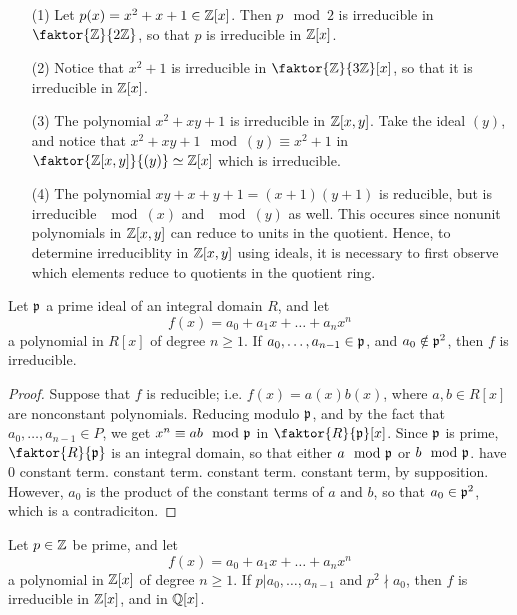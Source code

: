 \begin{example}\label{example_7.5}
    \begin{enumerate}
        \item[(1)] Let $p(x)=x^2+x+1 \in \mathbb{Z}[x]$. Then $p \mod{2}$ is irreducible
            in $\faktor{\Z}{2\Z}$, so that $p$ is irreducible in  $\mathbb{Z}[x]$.

        \item[(2)] Notice that $x^2+1$ is irreducible in  $\faktor{\Z}{3\Z}[x]$,
            so that it is irreducible in $\mathbb{Z}[x]$.

        \item[(3)] The polynomial $x^2+xy+1$ is irreducible in  $\mathbb{Z}[x,y]$. Take
            the ideal $(y)$, and notice that $x^2+xy+1 \mod{(y)} \equiv x^2+1$
            in $\faktor{\Z[x,y]}{(y)} \simeq \Z[x]$ which is irreducible.

        \item[(4)] The polynomial $xy+x+y+1=(x+1)(y+1)$ is reducible, but is
            irreducible $\mod{(x)}$ and $\mod{(y)}$ as well. This occures since
            nonunit polynomials in $\mathbb{Z}[x,y]$ can reduce to units in the
            quotient. Hence, to determine irreduciblity in $\mathbb{Z}[x,y]$ using
            ideals, it is necessary to first observe which elements reduce to
            quotients in the quotient ring.
    \end{enumerate}
\end{example}

\begin{theorem}\label{theorem_7.3.5}
    Let $\mathfrak{p}$ a prime ideal of an integral domain $R$, and let
    \begin{equation*}
        f(x)=a_0+a_1x+\dots+a_nx^n
    \end{equation*}
    a polynomial in $R[x]$ of degree $n \geq 1$. If $a_0, \dots, a_{n-1} \in
    \mathfrak{p}$, and $a_0 \notin \mathfrak{p}^2$, then $f$ is irreducible.
\end{theorem}
\begin{proof}
    Suppose that $f$ is reducible; i.e.  $f(x)=a(x)b(x)$, where $a,b \in R[x]$
    are nonconstant polynomials. Reducing modulo $\mathfrak{p}$, and by the fact that
    $a_0, \dots, a_{n-1} \in P$, we get $x^n \equiv ab \mod{\mathfrak{p}}$ in
    $\faktor{R}{\pf}[x]$. Since $\mathfrak{p}$ is prime,  $\faktor{R}{\pf}$ is an integral
    domain, so that either $a \mod{\mathfrak{p}}$ or $b \mod{\mathfrak{p}}$. have $0$ constant term.
    constant term. constant term. constant term, by supposition. However, $a_0$
    is the product of the constant terms of $a$ and $b$, so that $a_0 \in \mathfrak{p}^2$,
    which is a contradiciton.
\end{proof}
\begin{corollary}
    Let $p \in \mathbb{Z}$ be prime, and let
    \begin{equation*}
        f(x)=a_0+a_1x+\dots+a_nx^n
    \end{equation*}
    a polynomial in $\mathbb{Z}[x]$ of degree $n \geq 1$. If $p|a_0, \dots, a_{n-1}$ and
    $p^2 \nmid a_0$, then $f$ is irreducible in  $\mathbb{Z}[x]$, and in $\mathbb{Q}[x]$.
\end{corollary}

